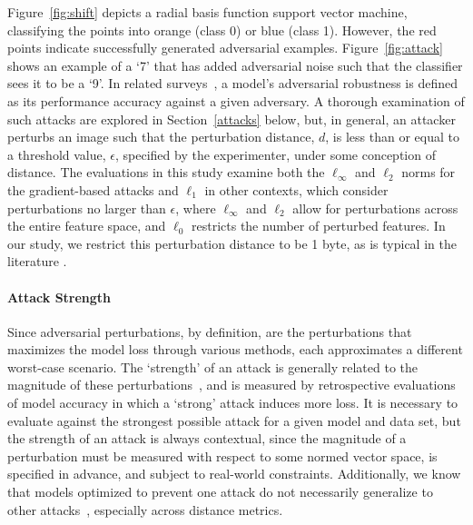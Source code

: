 \documentclass[journal]{IEEEtran}
\begin{document}
Figure~\ref{fig:shift} depicts a radial basis function support vector machine, classifying the points into orange (class 0) or blue (class 1). However, the red points indicate successfully generated adversarial examples. Figure~\ref{fig:attack} shows an example of a `7' that has added adversarial noise such that the classifier sees it to be a `9'. 
In related surveys~\cite{dohmatob_generalized_2019, biggio_evasion_2013-1, bect_bayesian_2017, chakraborty_adversarial_2018, carlini_towards_2017, croce_reliable_2020}, a model's adversarial robustness is defined as its performance accuracy against a given adversary. A thorough examination of such attacks are explored in Section~\ref{attacks} below, but, in general, an attacker perturbs an image such that the perturbation distance, $d$, is less than or equal to a threshold value, $\epsilon$, specified by the experimenter, under some conception of distance. The evaluations in this study examine both the $\ell_{\infty}$ and $\ell_2$ norms for the gradient-based attacks and $\ell_1$ in other contexts, which consider perturbations no larger than $\epsilon$, where $\ell_{\infty}$ and $\ell_2$ allow for perturbations across the entire feature space, and $\ell_0$ restricts the number of perturbed features. In our study, we restrict this perturbation distance to be 1 byte, as is typical in the literature \cite{madry2017towards, miller_adversarial_2020, biggio_evasion_2013, biggio_multiple_2009}. 

\paragraph{Attack Strength}
 Since adversarial perturbations, by definition, are the perturbations that maximizes the model loss through various methods, each approximates a different worst-case scenario. The `strength' of an attack is generally related to the magnitude of these perturbations~\cite{carlini_towards_2017}, and is measured by retrospective evaluations of model accuracy in which a `strong' attack induces more loss. It is necessary to evaluate against the strongest possible attack for a given model and data set, but the strength of an attack is always contextual, since the magnitude of a perturbation must be measured with respect to some normed vector space, is specified in advance, and subject to real-world constraints. Additionally, we know that models optimized to prevent one attack do not necessarily generalize to other attacks~\cite{carlini_towards_2017}, especially across distance metrics. 
\end{document}
